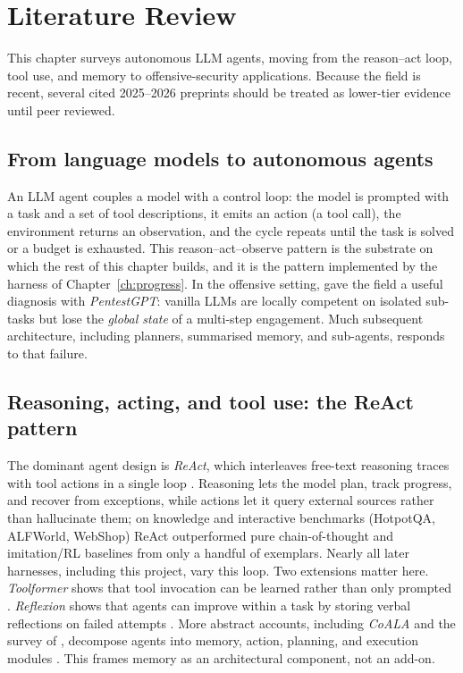 \documentclass[12pt,oneside]{report}
\begin{document}
\chapter{Literature Review}
\label{ch:litreview}

This chapter surveys autonomous LLM agents, moving from the reason--act loop,
tool use, and memory to offensive-security applications. Because the field is
recent, several cited 2025--2026 preprints should be treated as lower-tier
evidence until peer reviewed.

\section[From LLMs to autonomous agents]{From language models to autonomous agents}
An LLM agent couples a model with a control loop: the model is prompted with a
task and a set of tool descriptions, it emits an action (a tool call), the
environment returns an observation, and the cycle repeats until the task is
solved or a budget is exhausted. This reason--act--observe pattern is the
substrate on which the rest of this chapter builds, and it is the pattern
implemented by the harness of Chapter~\ref{ch:progress}. In the offensive
setting, \citet{deng2023pentestgpt} gave the field a useful diagnosis with
\emph{PentestGPT}: vanilla LLMs are locally competent on isolated sub-tasks but
lose the \emph{global state} of a multi-step engagement. Much subsequent
architecture, including planners, summarised memory, and sub-agents, responds to
that failure.

\section[Reasoning, acting, and tool use]{Reasoning, acting, and tool use: the ReAct pattern}
The dominant agent design is \emph{ReAct}, which interleaves free-text reasoning
traces with tool actions in a single loop \citep{yao2023react}. Reasoning lets
the model plan, track progress, and recover from exceptions, while actions let
it query external sources rather than hallucinate them; on knowledge and
interactive benchmarks (HotpotQA, ALFWorld, WebShop) ReAct outperformed pure
chain-of-thought and imitation/RL baselines from only a handful of exemplars.
Nearly all later harnesses, including this project, vary this loop. Two
extensions matter here. \emph{Toolformer} shows that tool invocation can be
learned rather than only prompted \citep{schick2023toolformer}. \emph{Reflexion}
shows that agents can improve within a task by storing verbal reflections on
failed attempts \citep{shinn2023reflexion}. More abstract accounts, including
\emph{CoALA} and the survey of \citet{wang2024agentsurvey}, decompose agents into
memory, action, planning, and execution modules \citep{sumers2024coala}. This
frames memory as an architectural component, not an add-on.
\end{document}
